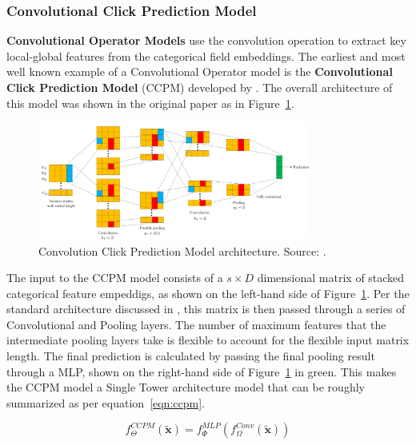 \documentclass{mldsmsc}
\begin{document}
\subsubsection{Convolutional Click Prediction Model}

\textbf{Convolutional Operator Models} use the convolution operation to extract key local-global
features from the categorical field embeddings. The earliest and most well known example of a
Convolutional Operator model is the \textbf{Convolutional Click Prediction Model} (CCPM)
developed by \cite{RefWorks:liu2015convolutional}. The overall architecture of this model
was shown in the original paper as in Figure~\ref{fig:ccpm}.

\begin{figure}[h]
    \centering
    \includegraphics[width=0.8\textwidth]{../figures/ccpm}
    \caption{Convolution Click Prediction Model architecture. Source: \citep{RefWorks:liu2015convolutional}.}
    \label{fig:ccpm}
\end{figure}

The input to the CCPM model consists of a $s \times D$ dimensional matrix of stacked categorical
feature empeddigs, as shown on the left-hand side of Figure~\ref{fig:ccpm}. Per the standard
architecture discussed in \citep{RefWorks:liu2015convolutional}, this matrix is then passed through
a series of Convolutional and Pooling layers. The number
of maximum features that the intermediate pooling layers take is flexible to account for the
flexible input matrix length. The final prediction is calculated by passing the final
pooling result through a MLP, shown on the right-hand side of Figure~\ref{fig:ccpm} in green.
This makes the CCPM model a Single Tower architecture model that can be roughly summarized
as per equation~\ref{eqn:ccpm}.

\begin{equation}\label{eqn:ccpm}
    f_{\Theta}^{CCPM}(\tilde{\mathbf{x}}) = f_{\Phi}^{MLP}(f_{\Omega}^{Conv}(\tilde{\mathbf{x}}))
\end{equation}
\end{document}
